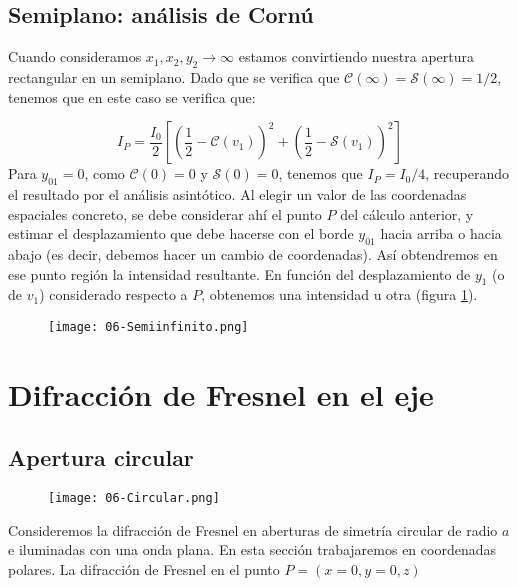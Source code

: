 \documentclass[12pt,a4paper]{book}
\numberwithin{equation}{section}
\numberwithin{figure}{section}
\newcommand{\parentesis}[1]{\left( #1  \right)}
\newcommand{\ccorchetes}[1]{\left[ #1  \right]}
\newcommand{\1}{_{(1)}}
\newcommand{\2}{_{(2)}}
\newcommand{\Ccal}{\mathcal{C}}
\newcommand{\Scal}{\mathcal{S}}
\theoremstyle{definition}
\begin{document}
\subsection{Semiplano: análisis de Cornú}

Cuando consideramos $x_1,x_2,y_2 \rightarrow \infty$ estamos convirtiendo nuestra apertura rectangular en un semiplano. Dado que se verifica que $\Ccal (\infty) = \Scal (\infty) = 1/2$, tenemos que en este caso se verifica que:

\begin{equation}
    I_P = \frac{I_0}{2} \ccorchetes{\parentesis{\frac{1}{2}-\Ccal(v_1)}^2+\parentesis{\frac{1}{2}-\Scal(v_1)}^2}
\end{equation}
Para $y_{01}=0$, como $\Ccal(0)=0$ y $\Scal(0)=0$, tenemos que $I_P=I_0/4$, recuperando el resultado por el análisis asintótico. Al elegir un valor de las coordenadas espaciales concreto, se debe considerar ahí el punto $P$ del cálculo anterior, y estimar el desplazamiento que debe hacerse con el borde $y_{01}$ hacia arriba o hacia abajo (es decir, debemos hacer un cambio de coordenadas). Así obtendremos en ese punto región la intensidad resultante. En función del desplazamiento de $y_1$ (o de $v_1$) considerado respecto a $P$, obtenemos una intensidad u otra (figura \ref{Fig:06.1-03}).

\begin{figure}[h!]
    \centering
    \texttt{[image: 06-Semiinfinito.png]}
    \caption{}
    \label{Fig:06.1-03}
\end{figure}

\section{Difracción de Fresnel en el eje}

\subsection{Apertura circular}

\begin{figure}[h!]
    \centering
    \texttt{[image: 06-Circular.png]}
    \label{Fig:06.1-02}
\end{figure}

Consideremos la difracción de Fresnel en aberturas de simetría circular de radio $a$ e iluminadas con una onda plana. En esta sección trabajaremos en coordenadas polares. La difracción de Fresnel en el punto $P=(x=0,y=0,z)$
\end{document}
